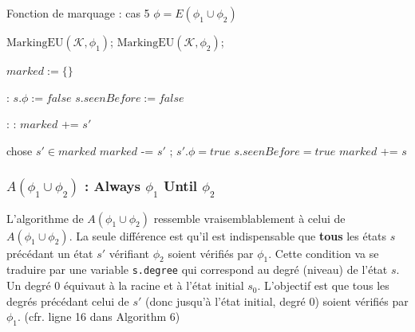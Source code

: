 \documentclass[runningheads,a4paper,10pt]{llncs}
\newcommand{\var}[1]{\mathit{#1}}
\newcommand{\func}[1]{\mathrm{#1}}
\begin{document}
\begin{algorithm}
  \caption{Fonction de marquage : cas 5 $\phi = E(\phi_{1} \cup \phi_{2})$}\label{euclid}
  \begin{algorithmic}[1]
  \State $\func{MarkingEU}(\mathcal{K}, \phi_{1})$;
  \State $\func{MarkingEU}(\mathcal{K}, \phi_{2})$;
  
  \State $marked := \{\}$
  
  \ForAll{$\var{s}$ in $\var{S}$}:
  \State $s.\phi := false$
  \State $s.seenBefore := false$ 
  \EndFor
  
  \ForAll{$\var{s'}$ in $\var{S}$}:
  :
  \State $marked$ += $s'$
  \EndIf  
  \EndFor
  
  
  \Do
  	\State chose $s' \in marked$ 
  	\State $marked$ -= $s'$ ;  $s'.\phi = true$ 
    \State $s.seenBefore = true$
    \State $marked$ += $s$ 
    
     
    \EndIf
    \EndIf
    \EndFor
    
  
  \EndProcedure
  \end{algorithmic}
\end{algorithm}
  
\newpage 

\subsubsection{$A(\phi_{1} \cup \phi_{2})$ : Always $\phi_{1}$ Until $\phi_{2}$}

L'algorithme de $A(\phi_{1} \cup \phi_{2})$ ressemble vraisemblablement à celui de $A(\phi_{1} \cup \phi_{2})$. La seule différence est qu'il est indispensable que \textbf{tous} les états $s$ précédant un état $s'$ vérifiant $\phi_{2}$ soient vérifiés par $\phi_{1}$. Cette condition va se traduire par une variable \texttt{s.degree} qui correspond au degré (niveau) de l'état $s$. Un degré 0 équivaut à la racine et à l'état initial $s_{0}$. L'objectif est que tous les degrés précédant celui de $s'$ (donc jusqu'à l'état initial, degré 0) soient vérifiés par $\phi_{1}$. (cfr. ligne 16 dans Algorithm 6)
\end{document}
